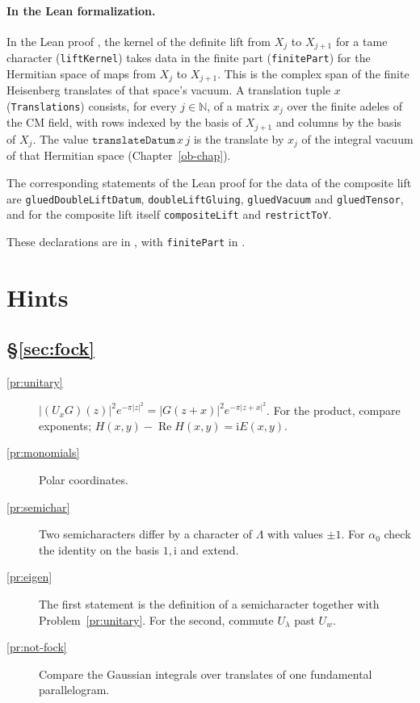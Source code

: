 \documentclass[reqno]{amsart}
\newcounter{chap}
\theoremstyle{definition}
\theoremstyle{plain}
\newcommand{\ii}{\mathrm{i}}
\begin{document}
\paragraph{In the Lean formalization.}
In the Lean proof \cite{GL}, the kernel of the definite lift from \(X_j\) to \(X_{j+1}\) for a tame character (\texttt{liftKernel}) takes data in the finite part (\texttt{finitePart}) for the Hermitian space of maps from \(X_j\) to \(X_{j+1}\).  This is the complex span of the finite Heisenberg translates of that space's vacuum.  A translation tuple \(x\) (\texttt{Translations}) consists, for every \(j \in \mathbb{N}\), of a matrix \(x_j\) over the finite adeles of the CM field, with rows indexed by the basis of \(X_{j+1}\) and columns by the basis of \(X_j\).  The value \(\texttt{translateDatum}\,x\,j\) is the translate by \(x_j\) of the integral vacuum of that Hermitian space (Chapter~\ref{ob-chap}).

The corresponding statements of the Lean proof for the data of the composite lift are \texttt{gluedDoubleLiftDatum}, \texttt{doubleLiftGluing}, \texttt{gluedVacuum} and \texttt{gluedTensor}, and for the composite lift itself \texttt{compositeLift} and \texttt{restrictToY}.

These declarations are in , with \texttt{finitePart} in .

\section*{Hints}

\subsection*{\S\ref{sec:fock}}
\begin{description}
\item[\ref{pr:unitary}] \(\lvert(U_xG)(z)\rvert^2 e^{-\pi\lvert z\rvert^2} = \lvert G(z+x)\rvert^2 e^{-\pi\lvert z+x\rvert^2}\).  For the product, compare exponents; \(H(x,y) - \operatorname{Re}H(x,y) = \ii E(x,y)\).
\item[\ref{pr:monomials}] Polar coordinates.
\item[\ref{pr:semichar}] Two semicharacters differ by a character of \(\Lambda\) with values \(\pm1\).  For \(\alpha_0\) check the identity on the basis \(1, \ii\) and extend.
\item[\ref{pr:eigen}] The first statement is the definition of a semicharacter together with Problem~\ref{pr:unitary}.  For the second, commute \(U_\lambda\) past \(U_w\).
\item[\ref{pr:not-fock}] Compare the Gaussian integrals over translates of one fundamental parallelogram.
\end{description}
\end{document}
